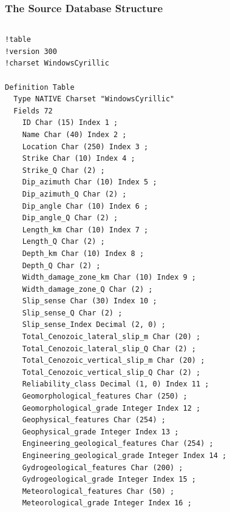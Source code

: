 \documentclass[10pt]{beamer}
\begin{document}
\begin{frame}[fragile]
  \frametitle{The Source Database Structure}
  \begin{columns}\tiny
    \begin{column}{0.5\linewidth}
\begin{verbatim}
!table
!version 300
!charset WindowsCyrillic

Definition Table
  Type NATIVE Charset "WindowsCyrillic"
  Fields 72
    ID Char (15) Index 1 ;
    Name Char (40) Index 2 ;
    Location Char (250) Index 3 ;
    Strike Char (10) Index 4 ;
    Strike_Q Char (2) ;
    Dip_azimuth Char (10) Index 5 ;
    Dip_azimuth_Q Char (2) ;
    Dip_angle Char (10) Index 6 ;
    Dip_angle_Q Char (2) ;
    Length_km Char (10) Index 7 ;
    Length_Q Char (2) ;
    Depth_km Char (10) Index 8 ;
    Depth_Q Char (2) ;
    Width_damage_zone_km Char (10) Index 9 ;
    Width_damage_zone_Q Char (2) ;
    Slip_sense Char (30) Index 10 ;
    Slip_sense_Q Char (2) ;
    Slip_sense_Index Decimal (2, 0) ;
    Total_Cenozoic_lateral_slip_m Char (20) ;
    Total_Cenozoic_lateral_slip_Q Char (2) ;
    Total_Cenozoic_vertical_slip_m Char (20) ;
    Total_Cenozoic_vertical_slip_Q Char (2) ;
    Reliability_class Decimal (1, 0) Index 11 ;
    Geomorphological_features Char (250) ;
    Geomorphological_grade Integer Index 12 ;
    Geophysical_features Char (254) ;
    Geophysical_grade Integer Index 13 ;
    Engineering_geological_features Char (254) ;
    Engineering_geological_grade Integer Index 14 ;
    Gydrogeological_features Char (200) ;
    Gydrogeological_grade Integer Index 15 ;
    Meteorological_features Char (50) ;
    Meteorological_grade Integer Index 16 ;
\end{verbatim}
    \end{column}
    \begin{column}{0.5\linewidth}
\begin{verbatim}


\end{verbatim}
\end{column}
\end{columns}
\end{frame}
\end{document}
